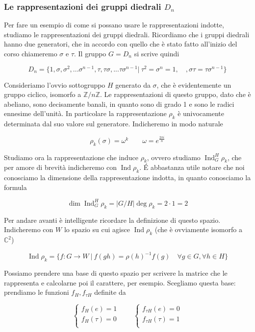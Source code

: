 \documentclass[11pt]{article}
\theoremstyle{plain}
\theoremstyle{definition}
\theoremstyle{remark}
\newcommand{\C}{\mathbb{C}}
\newcommand{\Z}{\mathbb{Z}}
\DeclareMathOperator{\Ind}{Ind}
\begin{document}
\subsubsection{Le rappresentazioni dei gruppi diedrali $D_{n}$}
Per fare un esempio di come si possano usare le rappresentazioni indotte, studiamo le rappresentazioni dei gruppi diedrali. Ricordiamo che i gruppi diedrali hanno due generatori, che in accordo con quello che è stato fatto all'inizio del corso chiameremo $\sigma$ e $\tau$. Il gruppo $G = D_{n}$ si scrive quindi

\[ D_{n} = \{ 1, \sigma, \sigma^2, ... \sigma^{n-1}, \tau, \tau\sigma, ... \tau\sigma^{n-1} | \ \tau^2 = \sigma^n = 1, \quad, \sigma\tau = \tau\sigma^{n-1} \}\]


Consideriamo l'ovvio sottogruppo $H$ generato da $\sigma$, che è evidentemente un gruppo ciclico, isomorfo a $\Z / n \Z$. Le rappresentazioni di questo gruppo, dato che è abeliano, sono decisamente banali, in quanto sono di grado 1 e sono le radici ennesime dell'unità. In particolare la rappresentazione $\rho_k$ è univocamente determinata dal suo valore sul generatore. Indicheremo in modo naturale

\[\rho_k(\sigma) = \omega^k  \qquad \omega = e^{\frac{2\pi i}{n}}\]


Studiamo ora la rappresentazione che induce $\rho_k$, ovvero studiamo $\Ind_G^H \rho_k$, che per amore di brevità indicheremo con $\Ind \rho_k$. \'E abbastanza utile notare che noi conosciamo la dimensione della rappresentazione indotta, in quanto conosciamo la formula

\[ \dim \Ind^H_G \rho_k = |G/H| \deg \rho_k = 2 \cdot 1 = 2\]

Per andare avanti è intelligente ricordare la definizione di questo spazio. Indicheremo con $W$ lo spazio su cui agisce $\Ind \rho_k$ (che è ovviamente isomorfo a $\C^2$)


\[ \Ind \rho_k = \{ f : G \to W\ |\ f(gh) = \rho(h)^{-1} f(g) \quad \forall g \in G, \forall h \in H \}\]

Possiamo prendere una base di questo spazio per scrivere la matrice che le rappresenta e calcolarne poi il carattere, per esempio. Scegliamo questa base: prendiamo le funzioni $f_H, f_{\tau H}$ definite da 

\[ 
\begin{cases}
f_H (e) = 1 \\
f_H (\tau) = 0 \\
\end{cases}
\qquad
\begin{cases}
f_{\tau H} (e) = 0 \\
f_{\tau H } (\tau) = 1 \\
\end{cases}
\]
\end{document}
